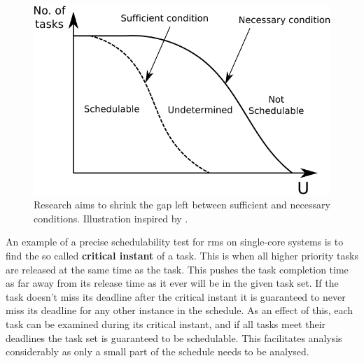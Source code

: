 \documentclass{kththesis}
\begin{document}
\begin{figure}

    \centering

    \includegraphics[width=0.8\linewidth]{images/sufficient_necessary_schedulability.pdf}

    \caption{Research aims to shrink the gap left between sufficient and necessary conditions.
    Illustration inspired by \parencite{sebestyen_simulation-based_2012}.}

    \label{fig:sufficient_necessary_schedulability}

\end{figure}

An example of a precise schedulability test for \acrshort{rms} on single-core systems is to find the
so called \textbf{critical instant} of a task. This is when all higher priority tasks are released
at the same time as the task. This pushes the task completion time as far away from its release time
as it ever will be in the given task set. If the task doesn't miss its deadline after the critical
instant it is guaranteed to never miss its deadline for any other instance in the schedule. As an
effect of this, each task can be examined during its critical instant, and if all tasks meet their
deadlines the task set is guaranteed to be schedulable. This facilitates analysis considerably as
only a small part of the schedule needs to be analysed.
\end{document}
